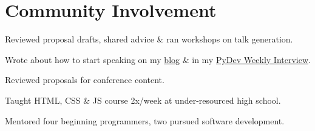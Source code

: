 \documentclass[letterpaper]{deedy-resume} %
\begin{document}
\begin{minipage}[t]{0.66\textwidth}
\section{Community Involvement}

%
\begin{tightitemize}
\item Reviewed proposal drafts, shared advice \& ran workshops on talk generation.
\item Wrote about how to start speaking on my \href{}{blog} \& in my \href{}{PyDev Weekly Interview}.
\end{tightitemize}
%
\sectionspace %


%
\begin{tightitemize}
\item Reviewed proposals for conference content.
\end{tightitemize}
%
\sectionspace %
\vspace{0.2\baselineskip}

%
\begin{tightitemize}
\item Taught HTML, CSS \& JS course 2x/week at under-resourced high school.
\end{tightitemize}
%
\sectionspace %


%
\begin{tightitemize}
\item Mentored four beginning programmers, two pursued software development.
\end{tightitemize}
%
\sectionspace %


\end{minipage}
\end{document}
